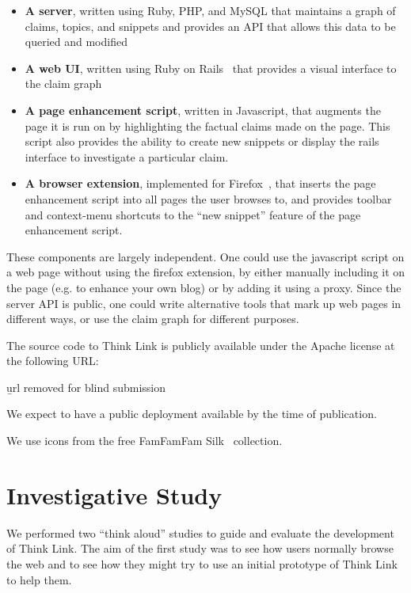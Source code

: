 \documentclass{chi2009}
\begin{document}
\begin{itemize}
\item {\bf A server}, written using Ruby, PHP, and MySQL that maintains a graph of claims, topics, and snippets and provides an API that allows this data to be queried and modified
\item {\bf A web UI}, written using Ruby on Rails~\cite{rails} that provides a visual interface to the claim graph
\item {\bf A page enhancement script}, written in Javascript, that augments the page it is run on by highlighting the factual claims made on the page. This script also provides the ability to create new snippets or display the rails interface to investigate a particular claim.
\item {\bf A browser extension}, implemented for Firefox~\cite{firefoxextension}, that inserts the page enhancement script into all pages the user browses to, and provides toolbar and context-menu shortcuts to the ``new snippet'' feature of the page enhancement script.
\end{itemize}

These components are largely independent. One could use the javascript script on a web page without using the firefox extension, by either manually including it on the page (e.g. to enhance your own blog) or by adding it using a proxy. Since the server API is public, one could write alternative tools that mark up web pages in different ways, or use the claim graph for different purposes.

The source code to Think Link is publicly available under the Apache license at the following URL:

{\b url removed for blind submission}

We expect to have a public deployment available by the time of publication.

We use icons from the free FamFamFam Silk~\cite{silkicons} collection.



\section{Investigative Study}

We performed two ``think aloud'' studies to guide and evaluate the development of Think Link. The aim of the first study was to see how users normally browse the web and to see how they might try to use an initial prototype of Think Link to help them. 
\end{document}
